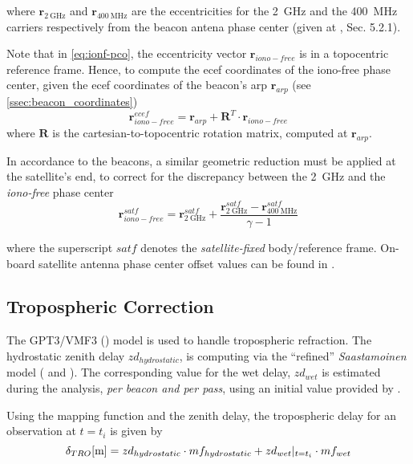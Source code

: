 where $\bm{r}_{\SI{2}{\GHz}}$ and $\bm{r}_{\SI{400}{\MHz}}$ are the 
eccentricities for the \SI{2}{\GHz} and the \SI{400}{\MHz} carriers respectively 
from the beacon antena phase center (given at \cite{DORISGSM}, Sec. 5.2.1).

Note that in \autoref{eq:ionf-pco}, the eccentricity vector $\bm{r}_{iono-free}$ 
is in a topocentric reference frame. Hence, to compute the \gls{ecef} coordinates of the 
iono-free phase center, given the \gls{ecef} coordinates of the beacon's 
\gls{arp} $\bm{r}_{arp}$ (see \ref{ssec:beacon_coordinates})
\begin{equation}
  \bm{r}^{ecef}_{iono-free} = \bm{r}_{arp} + \bm{R}^T \cdot \bm{r}_{iono-free}
  \label{eq:arp-to-if-pc}
\end{equation}
where $\bm{R}$ is the cartesian-to-topocentric rotation matrix, computed 
at $\bm{r}_{arp}$.

In accordance to the beacons, a similar geometric reduction must be applied 
at the satellite's end, to correct for the discrepancy between the \SI{2}{\GHz} 
and the \emph{iono-free} phase center
\begin{equation}
  \bm{r}^{satf}_{iono-free} = \bm{r}^{satf}_{\SI{2}{\GHz}} + 
    \frac{\bm{r}^{satf}_{\SI{2}{\GHz}} - 
    \bm{r}^{satf}_{\SI{400}{\MHz}}}{\gamma - 1}
\end{equation}

where the superscript $satf$ denotes the \emph{satellite-fixed} body/reference 
frame. On-board satellite antenna phase center offset values can be found in 
\cite{DorisSatModels}.

\subsection{Tropospheric Correction}\label{ssec-tropospheric-correction}
The GPT3/VMF3 (\cite{Landskron2018}) model is used to handle tropospheric refraction. 
The hydrostatic zenith delay $zd_{hydrostatic}$, is computing via the ``refined'' 
\emph{Saastamoinen} model (\cite{Davisetal85} and \cite{Saastamoinen72}). 
The corresponding value for the wet delay, $zd_{wet}$ is estimated during the 
analysis, \emph{per beacon and per pass}, using an initial value provided by 
\cite{Askneetal87}.

Using the mapping function and the zenith delay, the tropospheric 
delay for an observation at $t=t_i$ is given by
\begin{equation}\label{eq:tropo-delay}
  \delta _{TRO} [\si{\m}] = zd_{hydrostatic} \cdot mf_{hydrostatic} + zd_{wet}\at{t=t_i} \cdot mf_{wet}
\end{equation}

